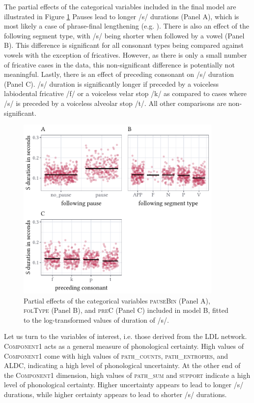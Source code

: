 The partial effects of the categorical variables included in the final model are illustrated in Figure \ref{fig:5_2} Pauses lead to longer /s/ durations (Panel A), which is most likely a case of phrase-final lengthening (e.g. \cite{Cooper1981}). There is also an effect of the following segment type, with /s/ being shorter when followed by a vowel (Panel B). This difference is significant for all consonant types being compared against vowels with the exception of fricatives. However, as there is only a small number of fricative cases in the data, this non-significant difference is potentially not meaningful. Lastly, there is an effect of preceding consonant on /s/ duration (Panel C). /s/ duration is significantly longer if preceded by a voiceless labiodental fricative /f/ or a voiceless velar stop /k/ as compared to cases where /s/ is preceded by a voiceless alveolar stop /t/. All other comparisons are non-significant.

\begin{figure}
    \centering
    \includegraphics[width=0.9\textwidth]{figures/fig5.2.pdf}
    \caption{Partial effects of the categorical variables \textsc{pauseBin} (Panel A), \textsc{folType} (Panel B), and \textsc{preC} (Panel C) included in model B, fitted to the log-transformed values of duration of /s/.}
    \label{fig:5_2}
\end{figure}

Let us turn to the variables of interest, i.e. those derived from the LDL network. \textsc{Component1} acts as a general measure of phonological certainty. High values of \textsc{Component1} come with high values of \textsc{path\_counts}, \textsc{path\_entropies}, and \textsc{ALDC}, indicating a high level of phonological uncertainty. At the other end of the \textsc{Component1} dimension, high values of \textsc{path\_sum} and \textsc{support} indicate a high level of phonological certainty. Higher uncertainty appears to lead to longer /s/ durations, while higher certainty appears to lead to shorter /s/ durations.

